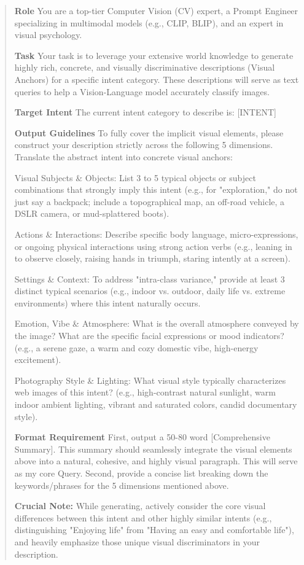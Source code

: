 \begin{quote}
\textbf{Role}
You are a top-tier Computer Vision (CV) expert, a Prompt Engineer specializing in multimodal models (e.g., CLIP, BLIP), and an expert in visual psychology.

\textbf{Task}
Your task is to leverage your extensive world knowledge to generate highly rich, concrete, and visually discriminative descriptions (Visual Anchors) for a specific intent category. These descriptions will serve as text queries to help a Vision-Language model accurately classify images.

\textbf{Target Intent}
The current intent category to describe is: [INTENT]

\textbf{Output Guidelines}
To fully cover the implicit visual elements, please construct your description strictly across the following 5 dimensions. Translate the abstract intent into concrete visual anchors:

Visual Subjects \& Objects:
List 3 to 5 typical objects or subject combinations that strongly imply this intent (e.g., for "exploration," do not just say a backpack; include a topographical map, an off-road vehicle, a DSLR camera, or mud-splattered boots).

Actions \& Interactions:
Describe specific body language, micro-expressions, or ongoing physical interactions using strong action verbs (e.g., leaning in to observe closely, raising hands in triumph, staring intently at a screen).

Settings \& Context:
To address "intra-class variance," provide at least 3 distinct typical scenarios (e.g., indoor vs. outdoor, daily life vs. extreme environments) where this intent naturally occurs.

Emotion, Vibe \& Atmosphere:
What is the overall atmosphere conveyed by the image? What are the specific facial expressions or mood indicators? (e.g., a serene gaze, a warm and cozy domestic vibe, high-energy excitement).

Photography Style \& Lighting:
What visual style typically characterizes web images of this intent? (e.g., high-contrast natural sunlight, warm indoor ambient lighting, vibrant and saturated colors, candid documentary style).

\textbf{Format Requirement}
First, output a 50-80 word [Comprehensive Summary]. This summary should seamlessly integrate the visual elements above into a natural, cohesive, and highly visual paragraph. This will serve as my core Query.
Second, provide a concise list breaking down the keywords/phrases for the 5 dimensions mentioned above.

\textbf{Crucial Note:} While generating, actively consider the core visual differences between this intent and other highly similar intents (e.g., distinguishing "Enjoying life" from "Having an easy and comfortable life"), and heavily emphasize those unique visual discriminators in your description.
\end{quote}


